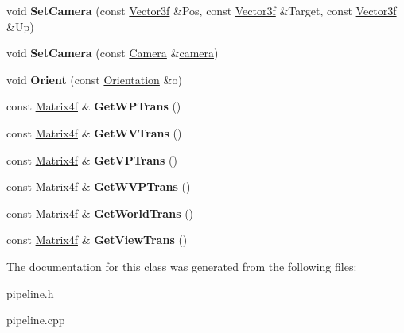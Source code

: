 \begin{DoxyCompactItemize}
\item 
\hypertarget{classPipeline_a9ec3b9c602bafe01ebb33734e8c174bf}{void {\bfseries Set\-Camera} (const \hyperlink{structVector3f}{Vector3f} \&Pos, const \hyperlink{structVector3f}{Vector3f} \&Target, const \hyperlink{structVector3f}{Vector3f} \&Up)}\label{classPipeline_a9ec3b9c602bafe01ebb33734e8c174bf}

\item 
\hypertarget{classPipeline_a7d339b813f78712a916635dc5b5602e5}{void {\bfseries Set\-Camera} (const \hyperlink{classCamera}{Camera} \&\hyperlink{classcamera}{camera})}\label{classPipeline_a7d339b813f78712a916635dc5b5602e5}

\item 
\hypertarget{classPipeline_a98c822f206c02ae3b2e521dd7381bba1}{void {\bfseries Orient} (const \hyperlink{structOrientation}{Orientation} \&o)}\label{classPipeline_a98c822f206c02ae3b2e521dd7381bba1}

\item 
\hypertarget{classPipeline_a31c4a3caff1e2324a1b0e392ad6b71e4}{const \hyperlink{classMatrix4f}{Matrix4f} \& {\bfseries Get\-W\-P\-Trans} ()}\label{classPipeline_a31c4a3caff1e2324a1b0e392ad6b71e4}

\item 
\hypertarget{classPipeline_ac2a974181aeb54efb291ff223fa3aca5}{const \hyperlink{classMatrix4f}{Matrix4f} \& {\bfseries Get\-W\-V\-Trans} ()}\label{classPipeline_ac2a974181aeb54efb291ff223fa3aca5}

\item 
\hypertarget{classPipeline_a3ffc1aec881ee9f08b6cb120185ee0d0}{const \hyperlink{classMatrix4f}{Matrix4f} \& {\bfseries Get\-V\-P\-Trans} ()}\label{classPipeline_a3ffc1aec881ee9f08b6cb120185ee0d0}

\item 
\hypertarget{classPipeline_a20ae073cd6e65969aee42689dd8cc6b6}{const \hyperlink{classMatrix4f}{Matrix4f} \& {\bfseries Get\-W\-V\-P\-Trans} ()}\label{classPipeline_a20ae073cd6e65969aee42689dd8cc6b6}

\item 
\hypertarget{classPipeline_ac072cb72c79c3a47d306e405b3a248de}{const \hyperlink{classMatrix4f}{Matrix4f} \& {\bfseries Get\-World\-Trans} ()}\label{classPipeline_ac072cb72c79c3a47d306e405b3a248de}

\item 
\hypertarget{classPipeline_af2c83d780f08fbe7135914490a16526f}{const \hyperlink{classMatrix4f}{Matrix4f} \& {\bfseries Get\-View\-Trans} ()}\label{classPipeline_af2c83d780f08fbe7135914490a16526f}

\end{DoxyCompactItemize}


The documentation for this class was generated from the following files\-:\begin{DoxyCompactItemize}
\item 
pipeline.\-h\item 
pipeline.\-cpp\end{DoxyCompactItemize}
